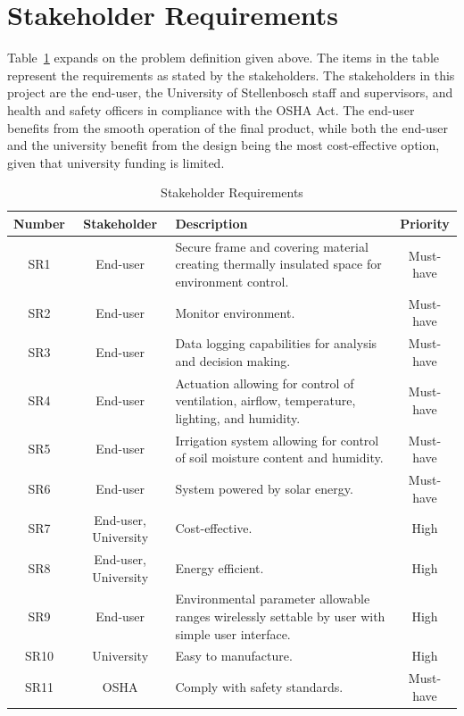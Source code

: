 \section{Stakeholder Requirements}


Table~\ref{tab:stakeholder_requirements} expands on the problem definition given above. The items in the table represent the requirements as stated by the stakeholders. The stakeholders in this project are the end-user, the University of Stellenbosch staff and supervisors, and health and safety officers in compliance with the OSHA Act. The end-user benefits from the smooth operation of the final product, while both the end-user and the university benefit from the design being the most cost-effective option, given that university funding is limited.

\begin{table}[H]
\centering
\small
\caption{Stakeholder Requirements}
\label{tab:stakeholder_requirements}
\renewcommand{\arraystretch}{1.2}
\begin{tabular}{|c|c|p{8cm}|c|}
\hline
\textbf{Number} & \textbf{Stakeholder} & \textbf{Description} & \textbf{Priority} \\
\hline
SR1  & End-user             & Secure frame and covering material creating thermally insulated space for environment control. & Must-have \\
\hline
SR2  & End-user             & Monitor environment. & Must-have \\
\hline
SR3  & End-user             & Data logging capabilities for analysis and decision making. & Must-have \\
\hline
SR4  & End-user             & Actuation allowing for control of ventilation, airflow, temperature, lighting, and humidity. & Must-have \\
\hline
SR5  & End-user             & Irrigation system allowing for control of soil moisture content and humidity. & Must-have \\
\hline
SR6  & End-user             & System powered by solar energy. & Must-have \\
\hline
SR7  & End-user, University & Cost-effective. & High \\
\hline
SR8  & End-user, University & Energy efficient. & High \\
\hline
SR9  & End-user             & Environmental parameter allowable ranges wirelessly settable by user with simple user interface. & High \\
\hline
SR10 & University           & Easy to manufacture. & High \\
\hline
SR11 & OSHA                 & Comply with safety standards. & Must-have \\
\hline
\end{tabular}
\end{table}



